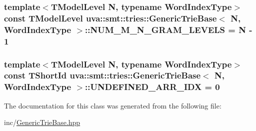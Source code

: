 \subsubsection[{N\+U\+M\+\_\+\+M\+\_\+\+N\+\_\+\+G\+R\+A\+M\+\_\+\+L\+E\+V\+E\+L\+S}]{\setlength{\rightskip}{0pt plus 5cm}template$<$T\+Model\+Level N, typename Word\+Index\+Type$>$ const {\bf T\+Model\+Level} {\bf uva\+::smt\+::tries\+::\+Generic\+Trie\+Base}$<$ N, {\bf Word\+Index\+Type} $>$\+::N\+U\+M\+\_\+\+M\+\_\+\+N\+\_\+\+G\+R\+A\+M\+\_\+\+L\+E\+V\+E\+L\+S = N -\/ 1\hspace{0.3cm}{\ttfamily [static]}}\label{classuva_1_1smt_1_1tries_1_1_generic_trie_base_a8d4621d497f16295a5cb6ee7b69c7904}
\hypertarget{classuva_1_1smt_1_1tries_1_1_generic_trie_base_a85d9088db3cde6a38327199da579f968}{}
\subsubsection[{U\+N\+D\+E\+F\+I\+N\+E\+D\+\_\+\+A\+R\+R\+\_\+\+I\+D\+X}]{\setlength{\rightskip}{0pt plus 5cm}template$<$T\+Model\+Level N, typename Word\+Index\+Type$>$ const {\bf T\+Short\+Id} {\bf uva\+::smt\+::tries\+::\+Generic\+Trie\+Base}$<$ N, {\bf Word\+Index\+Type} $>$\+::U\+N\+D\+E\+F\+I\+N\+E\+D\+\_\+\+A\+R\+R\+\_\+\+I\+D\+X = 0\hspace{0.3cm}{\ttfamily [static]}}\label{classuva_1_1smt_1_1tries_1_1_generic_trie_base_a85d9088db3cde6a38327199da579f968}


The documentation for this class was generated from the following file\+:\begin{DoxyCompactItemize}
\item 
inc/\hyperlink{_generic_trie_base_8hpp}{Generic\+Trie\+Base.\+hpp}\end{DoxyCompactItemize}
